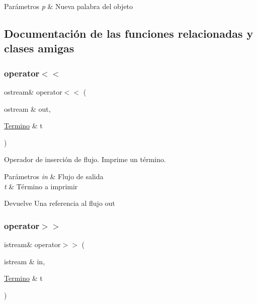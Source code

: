 \begin{DoxyParams}{Parámetros}
{\em p} & Nueva palabra del objeto \\
\hline
\end{DoxyParams}


\subsection{Documentación de las funciones relacionadas y clases amigas}
\mbox{\label{classTermino_a07bb15b9ddaa8cfc098576d47a7f9034}} 
\subsubsection{\texorpdfstring{operator$<$$<$}{operator<<}}
{\footnotesize\ttfamily ostream\& operator$<$$<$ (\begin{DoxyParamCaption}\item[{ostream \&}]{out,  }\item[{\mbox{\hyperlink{classTermino}{Termino}} \&}]{t }\end{DoxyParamCaption})\hspace{0.3cm}{\ttfamily [friend]}}



Operador de inserción de flujo. Imprime un término. 


\begin{DoxyParams}{Parámetros}
{\em in} & Flujo de salida \\
\hline
{\em t} & Término a imprimir \\
\hline
\end{DoxyParams}
\begin{DoxyReturn}{Devuelve}
Una referencia al flujo out 
\end{DoxyReturn}
\mbox{\label{classTermino_a42f635c3609287dbbf2bd65d035fa7f8}} 
\subsubsection{\texorpdfstring{operator$>$$>$}{operator>>}}
{\footnotesize\ttfamily istream\& operator$>$$>$ (\begin{DoxyParamCaption}\item[{istream \&}]{in,  }\item[{\mbox{\hyperlink{classTermino}{Termino}} \&}]{t }\end{DoxyParamCaption})\hspace{0.3cm}{\ttfamily [friend]}}



